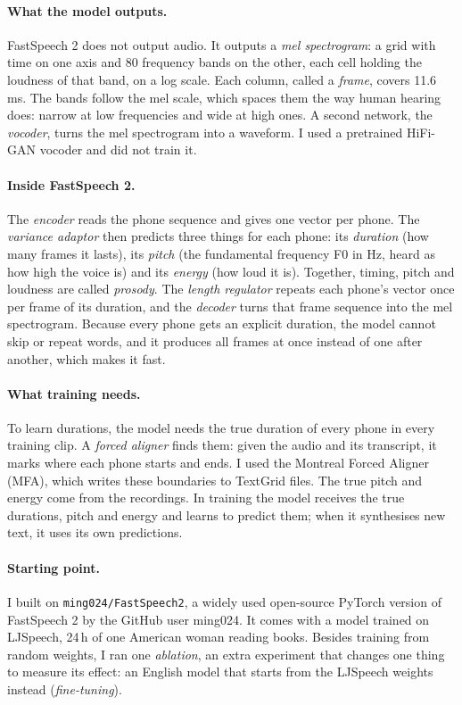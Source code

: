 \documentclass[11pt,a4paper]{article}
\newcommand{\code}[1]{\texttt{#1}}
\begin{document}
\paragraph{What the model outputs.} FastSpeech 2 does not output audio. It outputs a \emph{mel spectrogram}: a grid
with time on one axis and 80 frequency bands on the other, each cell holding the loudness of that band, on a log
scale. Each column, called a \emph{frame}, covers 11.6\,ms. The bands follow the mel scale, which spaces them the way
human hearing does: narrow at low frequencies and wide at high ones. A second network, the \emph{vocoder}, turns the
mel spectrogram into a waveform. I used a pretrained HiFi-GAN vocoder and did not train it.

\paragraph{Inside FastSpeech 2.} The \emph{encoder} reads the phone sequence and gives one vector per phone. The
\emph{variance adaptor} then predicts three things for each phone: its \emph{duration} (how many frames it lasts),
its \emph{pitch} (the fundamental frequency F0 in Hz, heard as how high the voice is) and its \emph{energy} (how
loud it is). Together, timing, pitch and loudness are called \emph{prosody}. The \emph{length regulator} repeats each
phone's vector once per frame of its duration, and the \emph{decoder} turns that frame sequence into the mel
spectrogram. Because every phone gets an explicit duration, the model cannot skip or repeat words, and it produces
all frames at once instead of one after another, which makes it fast.

\paragraph{What training needs.} To learn durations, the model needs the true duration of every phone in every
training clip. A \emph{forced aligner} finds them: given the audio and its transcript, it marks where each phone
starts and ends. I used the Montreal Forced Aligner (MFA), which writes these boundaries to TextGrid files. The
true pitch and energy come from the recordings. In training the model receives the true durations, pitch and
energy and learns to predict them; when it synthesises new text, it uses its own predictions.

\paragraph{Starting point.} I built on \code{ming024/FastSpeech2}, a widely used open-source PyTorch version of
FastSpeech 2 by the GitHub user ming024. It comes with a model trained on LJSpeech, 24\,h of one American woman
reading books. Besides training from random weights, I ran one \emph{ablation}, an extra experiment that changes one
thing to measure its effect: an English model that starts from the LJSpeech weights instead (\emph{fine-tuning}).
\end{document}
